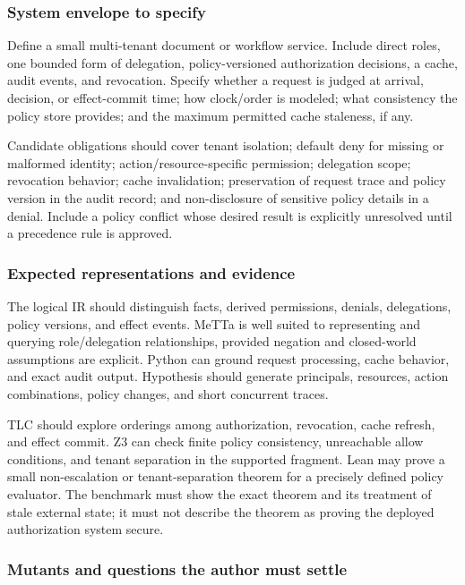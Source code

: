 \documentclass[11pt]{article}
\begin{document}
\subsubsection*{System envelope to specify}

Define a small multi-tenant document or workflow service.  Include direct
roles, one bounded form of delegation, policy-versioned authorization
decisions, a cache, audit events, and revocation.  Specify whether a request is
judged at arrival, decision, or effect-commit time; how clock/order is modeled;
what consistency the policy store provides; and the maximum permitted cache
staleness, if any.

Candidate obligations should cover tenant isolation; default deny for missing
or malformed identity; action/resource-specific permission; delegation scope;
revocation behavior; cache invalidation; preservation of request trace and
policy version in the audit record; and non-disclosure of sensitive policy
details in a denial.  Include a policy conflict whose desired result is
explicitly unresolved until a precedence rule is approved.

\subsubsection*{Expected representations and evidence}

The logical IR should distinguish facts, derived permissions, denials,
delegations, policy versions, and effect events.  MeTTa is well suited to
representing and querying role/delegation relationships, provided negation and
closed-world assumptions are explicit.  Python can ground request processing,
cache behavior, and exact audit output.  Hypothesis should generate principals,
resources, action combinations, policy changes, and short concurrent traces.

TLC should explore orderings among authorization, revocation, cache refresh,
and effect commit.  Z3 can check finite policy consistency, unreachable allow
conditions, and tenant separation in the supported fragment.  Lean may prove
a small non-escalation or tenant-separation theorem for a precisely defined
policy evaluator.  The benchmark must show the exact theorem and its treatment
of stale external state; it must not describe the theorem as proving the
deployed authorization system secure.

\subsubsection*{Mutants and questions the author must settle}
\end{document}
